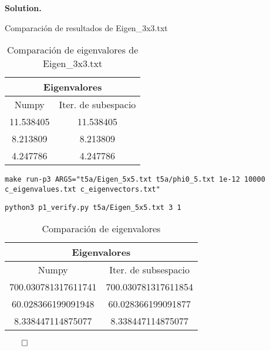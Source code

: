 \documentclass{article}
\theoremstyle{problemstyle}
\newenvironment{solution}{%
  \begin{mdframed}[linewidth=0.8pt,linecolor=Gray,backgroundcolor=Gray!5,roundcorner=5pt]%
  \noindent\textbf{Solution.}%
}{%
\hfill $ \qed $ 
  \end{mdframed}%
}
\begin{document}
\begin{solution}
\begin{table}[H]
\begin{center}
		\end{center}
		\caption{Comparaci\'on de resultados de Eigen\_3x3.txt}\label{tab:evecs3x3_new}
	\end{table}

	\begin{table}[H]
		\begin{center}
			\begin{tabular}{|c|c|}
				\multicolumn{2}{c}{Eigenvalores} \\
				\hline
				Numpy     & Iter. de subespacio  \\
				\hline
				\rule{0pt}{1.5em}
				11.538405 & 11.538405            \\
				[0.5em]
				\hline
				\rule{0pt}{1.5em}
				8.213809  & 8.213809             \\
				[0.5em]
				\hline
				\rule{0pt}{1.5em}
				4.247786  & 4.247786             \\
				[0.5em]
				\hline
			\end{tabular}
		\end{center}
		\caption{Comparaci\'on de eigenvalores de Eigen\_3x3.txt}\label{tab:aevals3x3}
	\end{table}

	\begin{center}
		\texttt{make run-p3 ARGS="t5a/Eigen\_5x5.txt t5a/phi0\_5.txt 1e-12 10000
			c\_eigenvalues.txt c\_eigenvectors.txt"}
	\end{center}
	\begin{center}
		\texttt{python3 p1\_verify.py t5a/Eigen\_5x5.txt 3 1}
	\end{center}

	\begin{table}[H]
		\begin{center}
			\begin{tabular}{|c|c|}
				\multicolumn{2}{c}{Eigenvalores}           \\
				\hline
				Numpy               & Iter. de subsespacio \\
				\hline

				700.030781317611741 & 700.030781317611854  \\
				\hline
				60.028366199091948  & 60.028366199091877   \\
				\hline
				8.338447114875077   & 8.338447114875077    \\
				\hline
			\end{tabular}
		\end{center}
		\caption{Comparaci\'on de eigenvalores}\label{tab:evals_comparison_large}
	\end{table}


\end{solution}
\end{document}
